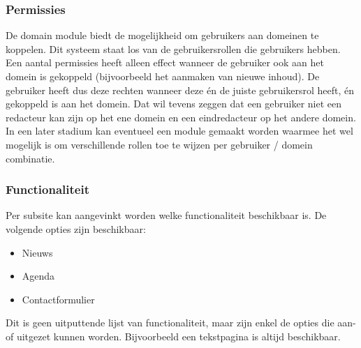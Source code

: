 \subsubsection{Permissies}
De domain module biedt de mogelijkheid om gebruikers aan domeinen te koppelen. Dit systeem staat los van de gebruikersrollen die gebruikers hebben. Een aantal permissies heeft alleen effect wanneer de gebruiker ook aan het domein is gekoppeld (bijvoorbeeld het aanmaken van nieuwe inhoud). De gebruiker heeft dus deze rechten wanneer deze \'{e}n de juiste gebruikersrol heeft, \'{e}n gekoppeld is aan het domein. Dat wil tevens zeggen dat een gebruiker niet een redacteur kan zijn op het ene domein en een eindredacteur op het andere domein. In een later stadium kan eventueel een module gemaakt worden waarmee het wel mogelijk is om verschillende rollen toe te wijzen per gebruiker / domein combinatie.

\subsubsection{Functionaliteit}
Per subsite kan aangevinkt worden welke functionaliteit beschikbaar is. De volgende opties zijn beschikbaar:
\begin{itemize}
\item Nieuws
\item Agenda
\item Contactformulier
\end{itemize}
Dit is geen uitputtende lijst van functionaliteit, maar zijn enkel de opties die aan- of uitgezet kunnen worden. Bijvoorbeeld een tekstpagina is altijd beschikbaar.